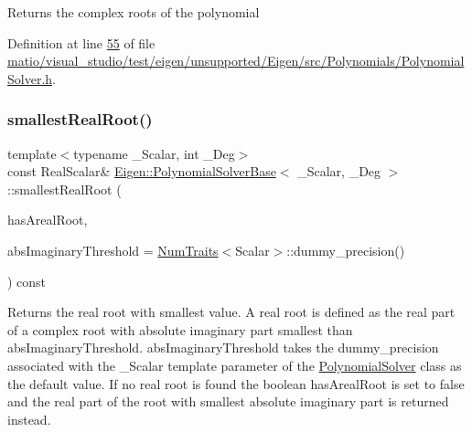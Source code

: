 \begin{DoxyReturn}{Returns}
the complex roots of the polynomial 
\end{DoxyReturn}


Definition at line \hyperlink{matio_2visual__studio_2test_2eigen_2unsupported_2_eigen_2src_2_polynomials_2_polynomial_solver_8h_source_l00055}{55} of file \hyperlink{matio_2visual__studio_2test_2eigen_2unsupported_2_eigen_2src_2_polynomials_2_polynomial_solver_8h_source}{matio/visual\+\_\+studio/test/eigen/unsupported/\+Eigen/src/\+Polynomials/\+Polynomial\+Solver.\+h}.

\mbox{\label{class_eigen_1_1_polynomial_solver_base_a24b054cdf82a8e9409bea47c3c05c756}} 
\subsubsection{\texorpdfstring{smallest\+Real\+Root()}{smallestRealRoot()}\hspace{0.1cm}{\footnotesize\ttfamily [1/2]}}
{\footnotesize\ttfamily template$<$typename \+\_\+\+Scalar, int \+\_\+\+Deg$>$ \\
const Real\+Scalar\& \hyperlink{class_eigen_1_1_polynomial_solver_base}{Eigen\+::\+Polynomial\+Solver\+Base}$<$ \+\_\+\+Scalar, \+\_\+\+Deg $>$\+::smallest\+Real\+Root (\begin{DoxyParamCaption}\item[{bool \&}]{has\+Areal\+Root,  }\item[{const Real\+Scalar \&}]{abs\+Imaginary\+Threshold = {\ttfamily \hyperlink{group___core___module_struct_eigen_1_1_num_traits}{Num\+Traits}$<$Scalar$>$\+:\+:dummy\+\_\+precision()} }\end{DoxyParamCaption}) const\hspace{0.3cm}{\ttfamily [inline]}}

\begin{DoxyReturn}{Returns}
the real root with smallest value. A real root is defined as the real part of a complex root with absolute imaginary part smallest than abs\+Imaginary\+Threshold. abs\+Imaginary\+Threshold takes the dummy\+\_\+precision associated with the \+\_\+\+Scalar template parameter of the \hyperlink{class_eigen_1_1_polynomial_solver}{Polynomial\+Solver} class as the default value. If no real root is found the boolean has\+Areal\+Root is set to false and the real part of the root with smallest absolute imaginary part is returned instead.
\end{DoxyReturn}

